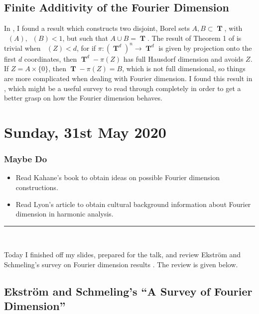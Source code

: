 \documentclass[openany,nobib,nols,a4paper,twoside,symmetric,justified,notoc]{tufte-book}
\theoremstyle{plain}
\theoremstyle{remark}
\theoremstyle{definition}
\newenvironment{maybedo}%
    {\subsection{Maybe Do}}%
    {\vspace{2mm}\hrule\hspace{\stretch{1}}\\}
\DeclareMathOperator{\TT}{\mathbf{T}}
\DeclareMathOperator{\fordim}{\text{dim}_{\mathbf{F}}}
\DeclareMathOperator{\minkdim}{\text{dim}_{\mathbf{M}}}
\begin{document}
\section{Finite Additivity of the Fourier Dimension}

In \cite{Ekstrom2014}, I found a result which constructs two disjoint, Borel sets $A, B \subset \TT$, with $\fordim(A), \fordim(B) < 1$, but such that $A \cup B = \TT$. The result of Theorem 1 of \cite{Denson2019} is trivial when $\minkdim(Z) < d$, for if $\pi: (\TT^d)^n \to \TT^d$ is given by projection onto the first $d$ coordinates, then $\TT^d - \pi(Z)$ has full Hausdorf dimension and avoids $Z$. If $Z = A \times \{ 0 \}$, then $\TT - \pi(Z) = B$, which is not full dimensional, so things are more complicated when dealing with Fourier dimension. I found this result in \cite{Ekstrom2017}, which might be a useful survey to read through completely in order to get a better grasp on how the Fourier dimension behaves.










\chapter{Sunday, 31st May 2020} \label{31052020}

\begin{maybedo}
\begin{itemize}
    \item Read Kahane's book \cite{Kahane1994} to obtain ideas on possible Fourier dimension constructions.

    \item Read Lyon's article \cite{Lyons1995} to obtain cultural background information about Fourier dimension in harmonic analysis.
\end{itemize}
\end{maybedo}

Today I finished off my slides, prepared for the talk, and review Ekstr\"{o}m and Schmeling's survey on Fourier dimension results \cite{Ekstrom2017}. The review is given below.

\section{Ekstr\"{o}m and Schmeling's ``A Survey of Fourier Dimension''}
\end{document}
